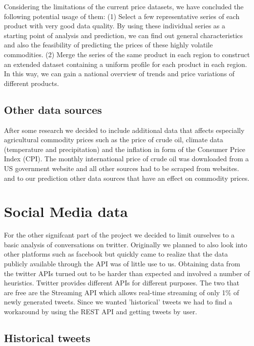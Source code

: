 Considering the limitations of the current price datasets, we have concluded the following potential usage of them: (1) Select a few representative series of each product with very good data quality. By using these individual series as a starting point of analysis and prediction, we can find out general characteristics and also the feasibility of predicting the prices of these highly volatile commodities. (2) Merge the series of the same product in each region to construct an extended dataset containing a uniform profile for each product in each region. In this way, we can gain a national overview of trends and price variations of different products.

\subsection*{Other data sources}
After some research we decided to include additional data that affects especially agricultural commodity prices such as the price of crude oil, climate data (temperature and precipitation) and the inflation in form of the Consumer Price Index (CPI). The monthly international price of crude oil  was downloaded from a US government website and all other sources had to be scraped from websites.  and  to our prediction other data sources that have an effect on commodity prices. 

\section*{Social Media data}
For the other signifcant part of the project we decided to limit ourselves to a basic analysis of conversations on twitter. Originally we planned to also look into other platforms such as facebook but quickly came to realize that the data publicly available through the API was of little use to us. Obtaining data from the twitter APIs turned out to be harder than expected and involved a number of heuristics. Twitter provides different APIs for different purposes. The two that are free are the Streaming API which allows real-time streaming of only 1\% of newly generated tweets. Since we wanted 'historical' tweets we had to find a workaround by using the REST API and getting tweets by user. 

\subsection*{Historical tweets}

